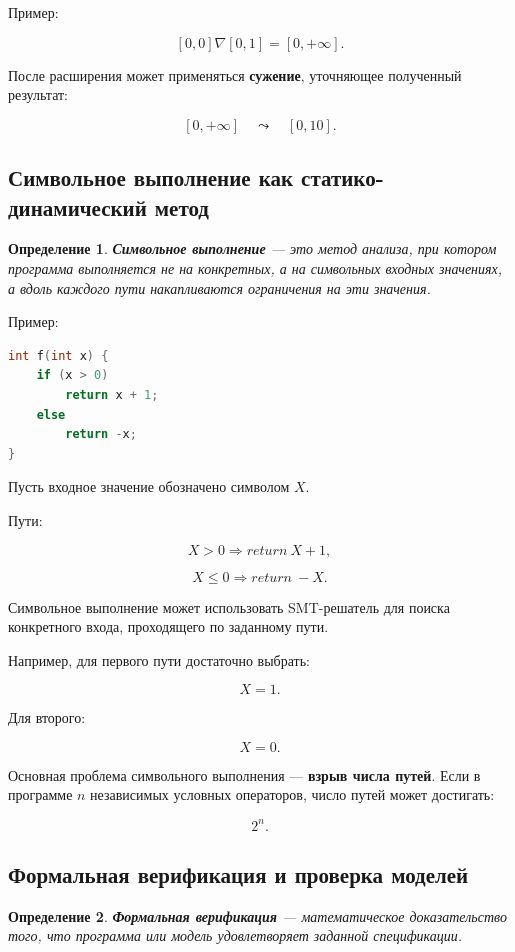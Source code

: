 \documentclass[12pt,a4paper]{article}
\newtheorem{definition}{Определение}
\begin{document}
Пример:

\[
[0,0] \nabla [0,1] = [0,+\infty].
\]

После расширения может применяться \textbf{сужение}, уточняющее полученный результат:

\[
[0,+\infty] \quad \leadsto \quad [0,10].
\]

\subsection{Символьное выполнение как статико-динамический метод}

\begin{definition}
\textbf{Символьное выполнение} --- это метод анализа, при котором программа выполняется не на конкретных, а на символьных входных значениях, а вдоль каждого пути накапливаются ограничения на эти значения.
\end{definition}

Пример:

\begin{lstlisting}[language=C]
int f(int x) {
    if (x > 0)
        return x + 1;
    else
        return -x;
}
\end{lstlisting}

Пусть входное значение обозначено символом $X$.

Пути:

\[
X > 0 \Rightarrow return\ X+1,
\]

\[
X \le 0 \Rightarrow return\ -X.
\]

Символьное выполнение может использовать SMT-решатель для поиска конкретного входа, проходящего по заданному пути.

Например, для первого пути достаточно выбрать:

\[
X=1.
\]

Для второго:

\[
X=0.
\]

Основная проблема символьного выполнения --- \textbf{взрыв числа путей}. Если в программе $n$ независимых условных операторов, число путей может достигать:

\[
2^n.
\]

\subsection{Формальная верификация и проверка моделей}

\begin{definition}
\textbf{Формальная верификация} --- математическое доказательство того, что программа или модель удовлетворяет заданной спецификации.
\end{definition}
\end{document}
